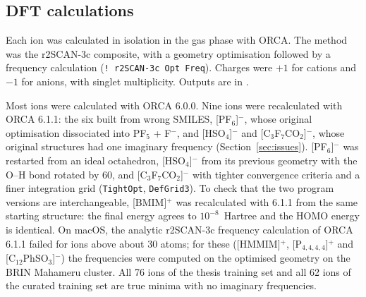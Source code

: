 \subsection{DFT calculations}
Each ion was calculated in isolation in the gas phase with ORCA\cite{neese2022orca}. The method was the r2SCAN-3c composite\cite{grimme2021r2scan}, with a geometry optimisation followed by a frequency calculation (\texttt{! r2SCAN-3c Opt Freq}). Charges were $+1$ for cations and $-1$ for anions, with singlet multiplicity. Outputs are in .

Most ions were calculated with ORCA 6.0.0. Nine ions were recalculated with ORCA 6.1.1: the six built from wrong SMILES, [PF$_6$]$^-$, whose original optimisation dissociated into PF$_5$ + F$^-$, and [HSO$_4$]$^-$ and [C$_3$F$_7$CO$_2$]$^-$, whose original structures had one imaginary frequency (Section~\ref{sec:issues}). [PF$_6$]$^-$ was restarted from an ideal octahedron, [HSO$_4$]$^-$ from its previous geometry with the O--H bond rotated by 60\textdegree, and [C$_3$F$_7$CO$_2$]$^-$ with tighter convergence criteria and a finer integration grid (\texttt{TightOpt}, \texttt{DefGrid3}). To check that the two program versions are interchangeable, [BMIM]$^+$ was recalculated with 6.1.1 from the same starting structure: the final energy agrees to $10^{-8}$~Hartree and the HOMO energy is identical. On macOS, the analytic r2SCAN-3c frequency calculation of ORCA 6.1.1 failed for ions above about 30 atoms; for these ([HMMIM]$^+$, [P$_{4,4,4,4}$]$^+$ and [C$_{12}$PhSO$_3$]$^-$) the frequencies were computed on the optimised geometry on the BRIN Mahameru cluster. All 76 ions of the thesis training set and all 62 ions of the curated training set are true minima with no imaginary frequencies.

